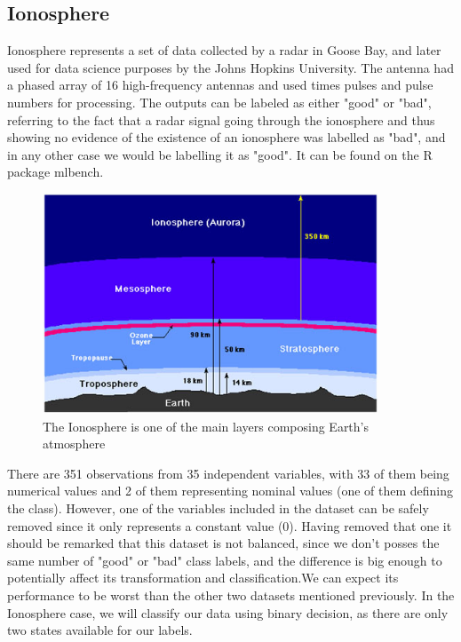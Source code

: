 \subsection{Ionosphere}

Ionosphere represents a set of data collected by a radar in Goose Bay, and later used for data science purposes by the Johns Hopkins University. The antenna had a phased array of 16 high-frequency antennas and used times pulses and pulse numbers for processing. The outputs can be labeled as either "good" or "bad", referring to the fact that a radar signal going through the ionosphere and thus showing no evidence of the existence of an ionosphere was labelled as "bad", and in any other case we would be labelling it as "good". It can be found on the R package mlbench. \newline

\begin{figure}[H]
	\centering
	\includegraphics[width=10cm]{Figuras_tfg/Ionosphere}
	\caption{The Ionosphere is one of the main layers composing Earth's atmosphere}
	\label{fig:figure_pairs_iris}
\end{figure}

There are 351 observations from 35 independent variables, with 33 of them being numerical values and 2 of them representing nominal values (one of them defining the class). However, one of the variables included in the dataset can be safely removed since it only represents a constant value (0). Having removed that one it should be remarked that this dataset is not balanced, since we don't posses the same number of "good" or "bad" class labels, and the difference is big enough to potentially affect its transformation and classification.We can expect its performance to be worst than the other two datasets mentioned previously. In the Ionosphere case, we will classify our data using binary decision, as there are only two states available for our labels. \par

